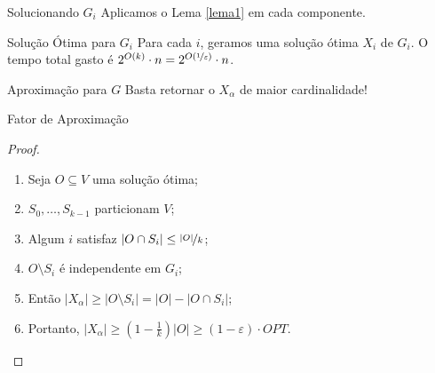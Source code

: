 \begin{frame}{Solucionando $G_i$}
    \centering\Large
    Aplicamos o Lema \ref{lema1} em cada componente.
\end{frame}

\begin{frame}{Solução Ótima para $G_i$}
    \centering\Large
    Para cada $i$, geramos uma solução ótima $X_i$ de $G_i$.
    \bigbreak
    O tempo total gasto é $2^{O(k)} \cdot n = 2^{O(\nicefrac{1}{\varepsilon})} \cdot n$.
\end{frame}

\begin{frame}{Aproximação para $G$}
    \centering\large
    Basta retornar o $X_\alpha$ de maior cardinalidade!
\end{frame}

\begin{frame}{Fator de Aproximação}
    \pause
    \begin{proof}
        \begin{enumerate}
            \setlength\itemsep{1em}
            \item<2,8> Seja $O \subseteq V$ uma solução ótima;
            \item<3,8> $S_0, \dots, S_{k-1}$ particionam $V$;
            \item<4,8> Algum $i$ satisfaz $|O \cap S_i| \leq \nicefrac{|O|}{k}$;
            \item<5,8> $O \setminus S_i$ é independente em $G_i$;
            \item<6,8> Então $|X_\alpha| \ge |O \setminus S_i| = |O| - |O \cap S_i|$;
            \item<7,8> Portanto, $|X_\alpha| \ge \left(1 - \frac{1}{k}\right)|O| \ge (1 - \varepsilon) \cdot OPT$.
        \end{enumerate}
    \end{proof}
\end{frame}
